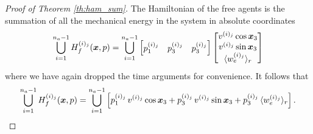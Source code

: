\begin{proof}[Proof of Theorem \ref{th:ham_sum}]
The Hamiltonian of the free agents is the summation of all the mechanical energy in the system in absolute coordinates \ie %
%
\begin{align}
	\bigcup_{i=1}^{n_a-1} H^{(i)_j}_f(\bm{x}, p) = \bigcup_{i=1}^{n_a-1} \begin{bmatrix}
		p_1^{(i)_j} & p_3^{(i)_j} & p_3^{(i)_j}
	\end{bmatrix} 
	\begin{bmatrix}
		v^{(i)_j} \cos \bm{x}_3 \\ v^{(i)_j} \sin \bm{x}_3 \\ \langle w_e^{(i)_j}\rangle_r
	\end{bmatrix}
\end{align}
%
where we have again dropped the time arguments for convenience. It follows that
%
\begin{align}
	\bigcup_{i=1}^{n_a-1} H^{(i)_j}_f(\bm{x}, p) = \bigcup_{i=1}^{n_a-1} 
		\left[p_1^{(i)_j} \, v^{(i)_j} \cos \bm{x}_3 + p_3^{(i)_j} \, v^{(i)_j} \sin \bm{x}_3 + p_3^{(i)_j}\, \langle w_e^{(i)_j}\rangle_r\right].
\end{align}


\end{proof}
